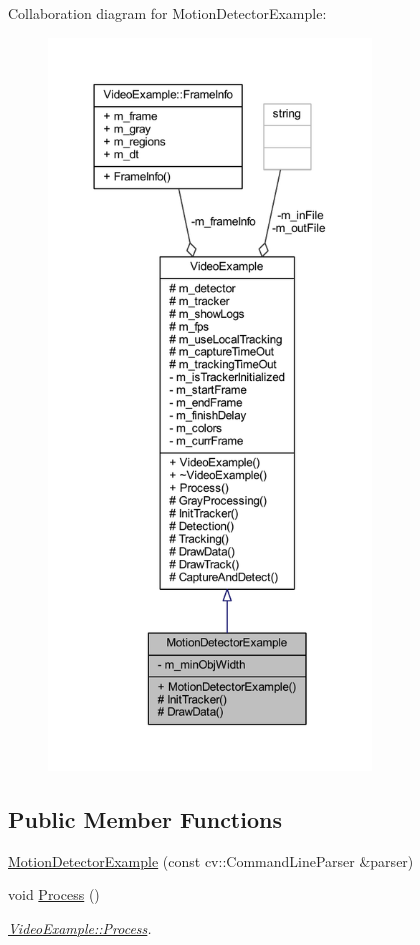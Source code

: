 Collaboration diagram for Motion\+Detector\+Example\+:\nopagebreak
\begin{figure}[H]
\begin{center}
\leavevmode
\includegraphics[height=550pt]{class_motion_detector_example__coll__graph}
\end{center}
\end{figure}
\subsection*{Public Member Functions}
\begin{DoxyCompactItemize}
\item 
\mbox{\hyperlink{class_motion_detector_example_a45f6928de240a6ac41a9b94027972d80}{Motion\+Detector\+Example}} (const cv\+::\+Command\+Line\+Parser \&parser)
\item 
void \mbox{\hyperlink{class_video_example_a87efc66a82c36ad3380623d30a12abf2}{Process}} ()
\begin{DoxyCompactList}\small\item\em \mbox{\hyperlink{class_video_example_a87efc66a82c36ad3380623d30a12abf2}{Video\+Example\+::\+Process}}. \end{DoxyCompactList}\end{DoxyCompactItemize}
